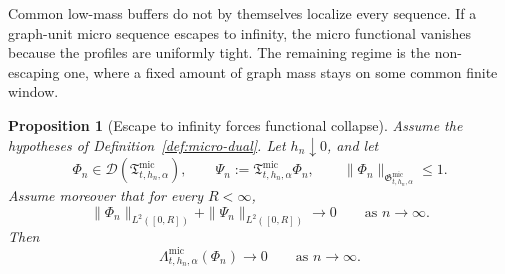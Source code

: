 \documentclass[11pt,a4paper]{amsart}
\theoremstyle{plain}
\newtheorem{proposition}[theorem]{Proposition}
\theoremstyle{definition}
\theoremstyle{remark}
\begin{document}
Common low-mass buffers do not by themselves localize every sequence.  If a graph-unit micro
sequence escapes to infinity, the micro functional vanishes because the profiles are uniformly
tight.  The remaining regime is the non-escaping one, where a fixed amount of graph mass stays on
some common finite window.

\begin{proposition}[Escape to infinity forces functional collapse]
\label{prop:escape-functional}
Assume the hypotheses of Definition~\ref{def:micro-dual}. Let \(h_n\downarrow0\), and let
\[
\Phi_n\in\mathcal D(\mathfrak T_{t,h_n,\alpha}^{\mathrm{mic}}),
\qquad
\Psi_n:=\mathfrak T_{t,h_n,\alpha}^{\mathrm{mic}}\Phi_n,
\qquad
\|\Phi_n\|_{\mathfrak G_{t,h_n,\alpha}^{\mathrm{mic}}}\le1.
\]
Assume moreover that for every \(R<\infty\),
\begin{equation}\label{eq:escape-head}
\|\Phi_n\|_{L^2([0,R])}
+
\|\Psi_n\|_{L^2([0,R])}
\longrightarrow0
\qquad\text{as }n\to\infty.
\end{equation}
Then
\begin{equation}\label{eq:escape-functional}
\Lambda_{t,h_n,\alpha}^{\mathrm{mic}}(\Phi_n)\longrightarrow0
\qquad\text{as }n\to\infty.
\end{equation}
\end{proposition}
\end{document}
